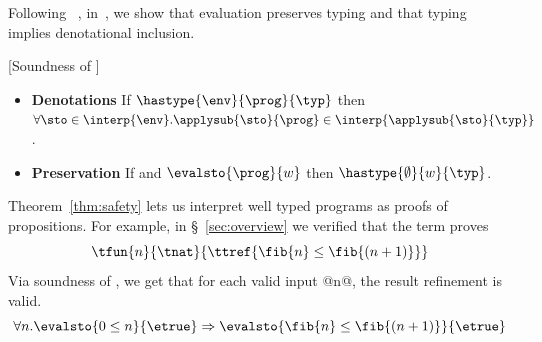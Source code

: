 Following \undeclang~\citep{Vazou14}, in~\citep{appendix}, we show that
evaluation preserves typing and that typing implies
denotational inclusion.
%
\begin{theorem}{[Soundness of \corelan]}\label{thm:safety}
\begin{itemize}
\item\textbf{Denotations}
If $\hastype{\env}{\prog}{\typ}$ then
$\forall \sto\in \interp{\env}. \applysub{\sto}{\prog} \in \interp{\applysub{\sto}{\typ}}$.
\item\textbf{Preservation}
If \hastype{\emptyset}{\prog}{\typ}
       and $\evalsto{\prog}{w}$ then $\hastype{\emptyset}{w}{\typ}$.
\end{itemize}
\end{theorem}

Theorem~\ref{thm:safety} lets us interpret well typed programs as proofs of
propositions.
%
For example, in \S~\ref{sec:overview} we verified that
the term \fibincrname proves
$${\tfun{n}{\tnat}{\ttref{\fib{n} \leq \fib{(n+1)}}}}$$
%
Via soundness of \corelan, we get that for each valid input @n@,
the result refinement is valid.
$$
\forall n. \evalsto{0 \leq n}{\etrue} \Rightarrow \evalsto{\fib{n} \leq \fib{(n+1)}}{\etrue}
$$
